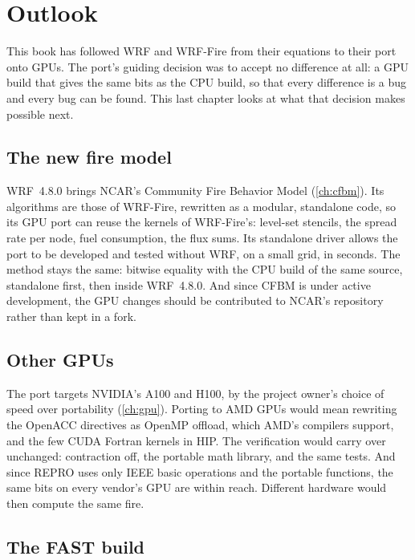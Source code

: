 \chapter{Outlook}\label{ch:outlook}

This book has followed WRF and WRF-Fire from their equations to their port onto GPUs. The port's guiding decision was
to accept no difference at all: a GPU build that gives the same bits as the CPU build, so that every difference is a
bug and every bug can be found. This last chapter looks at what that decision makes possible next.

\section{The new fire model}

WRF~4.8.0 brings NCAR's Community Fire Behavior Model (\cref{ch:cfbm}). Its algorithms are those of WRF-Fire, rewritten
as a modular, standalone code, so its GPU port can reuse the kernels of WRF-Fire's: level-set stencils, the spread
rate per node, fuel consumption, the flux sums. Its standalone driver allows the port to be developed and tested
without WRF, on a small grid, in seconds. The method stays the same: bitwise equality with the CPU build of the same
source, standalone first, then inside WRF~4.8.0. And since CFBM is under active development, the GPU changes should be
contributed to NCAR's repository rather than kept in a fork.

\section{Other GPUs}

The port targets NVIDIA's A100 and H100, by the project owner's choice of speed over portability (\cref{ch:gpu}).
Porting to AMD GPUs would mean rewriting the OpenACC directives as OpenMP offload, which AMD's compilers support,
and the few CUDA Fortran kernels in HIP. The verification would carry over unchanged: contraction off, the portable
math library, and the same tests. And since REPRO uses only IEEE basic operations and the portable functions, the
same bits on every vendor's GPU are within reach. Different hardware would then compute the same fire.

\section{The FAST build}

